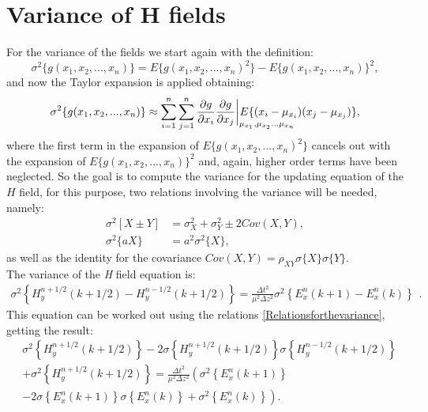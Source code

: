\documentclass[12pt, oneside]{book}
\begin{document}
\section{Variance of H fields}
For the variance of the fields we start again with the definition:
\begin{equation}
\sigma^2 \lbrace g(x_1,x_2,...,x_n)\rbrace = E\lbrace g(x_1,x_2,...,x_n)^2\rbrace - E\lbrace g(x_1,x_2,...,x_n)\rbrace ^2,
\end{equation}
and now the Taylor expansion is applied obtaining:
\begin{equation}\label{deltamethodvarh}
\sigma^2 \lbrace g(x_1,x_2,...,x_n)\rbrace \approx \sum_{i=1}^n\sum_{j=1}^n \frac{\partial g}{\partial x_i}\frac{\partial g}{\partial x_j} \bigg |_{\mathrlap{\mu_{x_1},\mu_{x_2}...\mu_{x_n}}} E\lbrace(x_i-\mu_{x_i})(x_j-\mu_{x_j})\rbrace,
\end{equation}
where the first term in the expansion of $E\lbrace g(x_1,x_2,...,x_n)^2\rbrace$ cancels out with the expansion of $E\lbrace g(x_1,x_2,...,x_n)\rbrace ^2$ and, again, higher order terms have been neglected.
So the goal is to compute the variance for the updating equation of the $H$ field, for this purpose, two relations involving the variance will be needed, namely:
\begin{equation}\label{Relationsforthevariance}
\begin{split}
\sigma^2\left[X\pm Y\right] & =\sigma_X^2+\sigma_Y^2\pm 2\textit{Cov}(X,Y), \\
\sigma^2\lbrace aX \rbrace  & = a^2 \sigma^2 \lbrace X \rbrace,
\end{split}
\end{equation}
as well as the identity for the covariance $\textit{Cov}(X,Y)=\rho_{XY}\sigma\lbrace X \rbrace \sigma\lbrace Y\rbrace$. \\
\indent The variance of the \textit{H} field equation is:
\begin{equation}
\begin{split}
\sigma^2\left\lbrace H_y^{n+1/2}(k+1/2)-H_y^{n-1/2}(k+1/2)\right\rbrace = \frac{\Delta t^2}{\mu^2 \Delta z^2}\sigma^2\left\lbrace E_x^n(k+1)-E_x^n(k)\right\rbrace
\end{split}.
\end{equation}
This equation can be worked out using the relations \ref{Relationsforthevariance}, getting the result:
\begin{equation}
\begin{split}
& \sigma^2\left\lbrace H_y^{n+1/2}(k+1/2)\right\rbrace-2\sigma\left\lbrace H_y^{n+1/2}(k+1/2)\right\rbrace \sigma\left\lbrace H_y^{n-1/2}(k+1/2)\right\rbrace \\
&+ \sigma^2\left\lbrace H_y^{n+1/2}(k+1/2)\right\rbrace=\frac{\Delta t^2}{\mu^2 \Delta z^2} \left(\sigma^2\left\lbrace E_x^n(k+1)\right\rbrace \right. \\
& \left. -2\sigma\left\lbrace E_x^n(k+1)\right\rbrace \sigma\left\lbrace E_x^n(k)\right\rbrace + \sigma^2 \left\lbrace E_x^n(k)\right\rbrace \right).
\end{split}
\end{equation}
\end{document}
